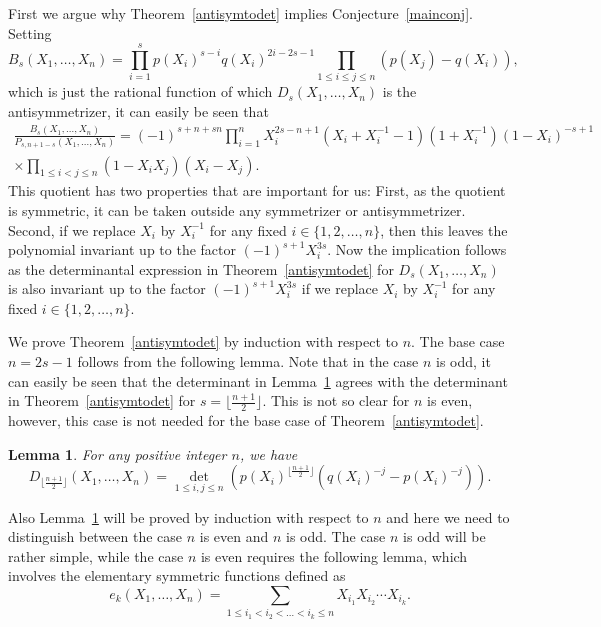 \documentclass[12pt,dvipsnames]{amsart}
\newtheorem{lemma}[theorem]{Lemma}
\theoremstyle{definition}
\begin{document}
First we argue why Theorem~\ref{antisymtodet} implies Conjecture~\ref{mainconj}. Setting 
$$
B_{s}(X_1,\ldots,X_n) = \prod_{i=1}^s p(X_i)^{s-i} q(X_i)^{2i-2s-1} \prod_{1 \le i \le j \le n} (p(X_j)-q(X_i)),
$$
which is just the rational function of which $D_s(X_1,\ldots,X_n)$ is the antisymmetrizer,
it can easily be seen that 
\begin{multline*} 
\frac{B_{s}(X_1,\ldots,X_n)}{P_{s,n+1-s}(X_1,\ldots,X_n)} = (-1)^{s+n+s n} 
\prod_{i=1}^n X_i^{2s-n+1} (X_i+X_i^{-1}-1) (1+X_i^{-1}) (1-X_i)^{-s+1} \\ \times 
\prod_{1 \le i < j \le n} (1-X_i X_j)(X_i-X_j).
\end{multline*} 
This quotient has two properties that are important for us: First, as the quotient is symmetric, it can be taken outside any symmetrizer or antisymmetrizer. Second, if we replace $X_i$ by $X_i^{-1}$ for any fixed $i \in \{1,2,\ldots,n\}$, then this leaves the polynomial invariant up to the factor $(-1)^{s+1} X_i^{3s}$. Now the implication follows as the determinantal expression in Theorem~\ref{antisymtodet} for $D_s(X_1,\ldots,X_n)$ is also invariant up to the factor $(-1)^{s+1} X_i^{3s}$ if we replace $X_i$ by $X_i^{-1}$ for any fixed $i \in \{1,2,\ldots,n\}$.

\bigskip

We prove Theorem~\ref{antisymtodet} by induction with respect to $n$. 
The base case $n=2s-1$ follows from the following lemma. 
Note that in the case $n$ is odd, it can easily be seen that the determinant in Lemma~\ref{basecase} agrees 
with the determinant in Theorem~\ref{antisymtodet} for $s=\lfloor \frac{n+1}{2} \rfloor$. This is not so clear for 
$n$ is even, however, this case is not needed for the base case of Theorem~\ref{antisymtodet}.  

\begin{lemma}
\label{basecase} 
For any positive integer $n$, we have   
$$D_{\lfloor \frac{n+1}{2} \rfloor}(X_1,\ldots,X_n) = 
\det_{1 \le i, j \le n} \left( p(X_i)^{\lfloor \frac{n+1}{2} \rfloor} \left( q(X_i)^{-j} - p(X_i)^{-j} \right) \right).$$
\end{lemma} 

Also Lemma~\ref{basecase} will be proved by induction with respect to $n$ and here we need to distinguish between the case $n$ is even and $n$ is odd. The case $n$ is odd will be rather simple, while the case $n$ is even requires the following 
lemma, which involves the elementary symmetric functions defined as 
$$
e_k(X_1,\ldots,X_n) = \sum_{1 \le i_1 < i_2 < \ldots < i_k \le n} X_{i_1} X_{i_2} \cdots X_{i_k}.
$$
\end{document}
